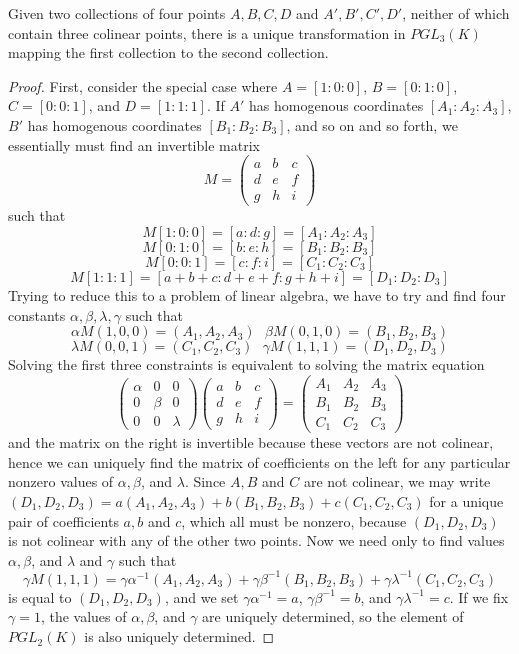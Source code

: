 \begin{theorem}
    Given two collections of four points $A,B,C,D$ and $A',B',C',D'$, neither of which contain three colinear points, there is a unique transformation in $PGL_3(K)$ mapping the first collection to the second collection.
\end{theorem}
\begin{proof}
    First, consider the special case where $A = [1:0:0]$, $B = [0:1:0]$, $C = [0:0:1]$, and $D = [1:1:1]$. If $A'$ has homogenous coordinates $[A_1:A_2:A_3]$, $B'$ has homogenous coordinates $[B_1:B_2:B_3]$, and so on and so forth, we essentially must find an invertible matrix
    \[ M = \begin{pmatrix} a & b & c \\ d & e & f \\ g & h & i \end{pmatrix} \]
    such that
    \[ M[1:0:0] = [a:d:g] = [A_1:A_2:A_3] \]
    \[ M[0:1:0] = [b:e:h] = [B_1:B_2:B_3] \]
    \[ M[0:0:1] = [c:f:i] = [C_1:C_2:C_3] \]
    \[ M[1:1:1] = [a+b+c:d+e+f:g+h+i] = [D_1:D_2:D_3] \]
    Trying to reduce this to a problem of linear algebra, we have to try and find four constants $\alpha, \beta, \lambda, \gamma$ such that
    \[ \alpha M(1,0,0) = (A_1,A_2,A_3)\ \ \ \beta M(0,1,0) = (B_1,B_2,B_3) \]
    \[ \lambda M(0,0,1) = (C_1,C_2,C_3)\ \ \ \gamma M(1,1,1) = (D_1,D_2,D_3) \]
    Solving the first three constraints is equivalent to solving the matrix equation
    \[ \begin{pmatrix} \alpha & 0 & 0 \\ 0 & \beta & 0 \\ 0 & 0 & \lambda \end{pmatrix} \begin{pmatrix} a & b & c \\ d & e & f \\ g & h & i \end{pmatrix} = \begin{pmatrix} A_1 & A_2 & A_3 \\ B_1 & B_2 & B_3 \\ C_1 & C_2 & C_3 \end{pmatrix} \]
    and the matrix on the right is invertible because these vectors are not colinear, hence we can uniquely find the matrix of coefficients on the left for any particular nonzero values of $\alpha, \beta$, and $\lambda$. Since $A,B$ and $C$ are not colinear, we may write $(D_1,D_2,D_3) = a(A_1,A_2,A_3) + b(B_1,B_2,B_3) + c(C_1,C_2,C_3)$ for a unique pair of coefficients $a,b$ and $c$, which all must be nonzero, because $(D_1,D_2,D_3)$ is not colinear with any of the other two points. Now we need only to find values $\alpha, \beta$, and $\lambda$ and $\gamma$ such that
    \[ \gamma M(1,1,1) = \gamma \alpha^{-1}(A_1,A_2,A_3) + \gamma \beta^{-1}(B_1,B_2,B_3) + \gamma \lambda^{-1}(C_1,C_2,C_3) \]
    is equal to $(D_1,D_2,D_3)$, and we set $\gamma \alpha^{-1} = a$, $\gamma \beta^{-1} = b$, and $\gamma \lambda^{-1} = c$. If we fix $\gamma = 1$, the values of $\alpha, \beta$, and $\gamma$ are uniquely determined, so the element of $PGL_2(K)$ is also uniquely determined.
\end{proof}

